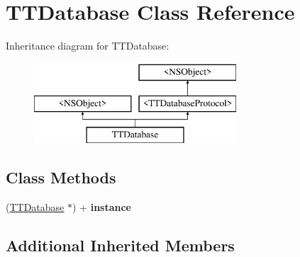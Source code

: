 \hypertarget{interface_t_t_database}{\section{T\-T\-Database Class Reference}
\label{interface_t_t_database}
}
Inheritance diagram for T\-T\-Database\-:\begin{figure}[H]
\begin{center}
\leavevmode
\includegraphics[height=3.000000cm]{interface_t_t_database}
\end{center}
\end{figure}
\subsection*{Class Methods}
\begin{DoxyCompactItemize}
\item 
\hypertarget{interface_t_t_database_acd3afda926b08b1398d0a00630bbda79}{(\hyperlink{interface_t_t_database}{T\-T\-Database} $\ast$) + {\bfseries instance}}\label{interface_t_t_database_acd3afda926b08b1398d0a00630bbda79}

\end{DoxyCompactItemize}
\subsection*{Additional Inherited Members}
